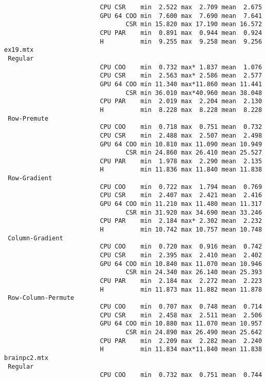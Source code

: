 {\begin{verbatim}
                          CPU CSR    min  2.522 max  2.709 mean  2.675
                          GPU 64 COO min  7.600 max  7.690 mean  7.641
                                 CSR min 15.820 max 17.190 mean 16.572
                          CPU PAR    min  0.891 max  0.944 mean  0.924
                          H          min  9.255 max  9.258 mean  9.256
ex19.mtx
 Regular
                          CPU COO    min  0.732 max* 1.837 mean  1.076
                          CPU CSR    min  2.563 max* 2.586 mean  2.577
                          GPU 64 COO min 11.340 max*11.860 mean 11.441
                                 CSR min 36.010 max*40.960 mean 38.048
                          CPU PAR    min  2.019 max  2.204 mean  2.130
                          H          min  8.228 max  8.228 mean  8.228
 Row-Premute
                          CPU COO    min  0.718 max  0.751 mean  0.732
                          CPU CSR    min  2.488 max  2.507 mean  2.498
                          GPU 64 COO min 10.810 max 11.090 mean 10.949
                                 CSR min 24.860 max 26.410 mean 25.527
                          CPU PAR    min  1.978 max  2.290 mean  2.135
                          H          min 11.836 max 11.840 mean 11.838
 Row-Gradient
                          CPU COO    min  0.722 max  1.794 mean  0.769
                          CPU CSR    min  2.407 max  2.421 mean  2.416
                          GPU 64 COO min 11.210 max 11.480 mean 11.317
                                 CSR min 31.920 max 34.690 mean 33.246
                          CPU PAR    min  2.184 max* 2.302 mean  2.232
                          H          min 10.742 max 10.757 mean 10.748
 Column-Gradient
                          CPU COO    min  0.720 max  0.916 mean  0.742
                          CPU CSR    min  2.395 max  2.410 mean  2.402
                          GPU 64 COO min 10.840 max 11.070 mean 10.946
                                 CSR min 24.340 max 26.140 mean 25.393
                          CPU PAR    min  2.184 max  2.272 mean  2.223
                          H          min 11.873 max 11.882 mean 11.878
 Row-Column-Permute
                          CPU COO    min  0.707 max  0.748 mean  0.714
                          CPU CSR    min  2.458 max  2.511 mean  2.506
                          GPU 64 COO min 10.880 max 11.070 mean 10.957
                                 CSR min 24.890 max 26.490 mean 25.642
                          CPU PAR    min  2.209 max  2.282 mean  2.240
                          H          min 11.834 max*11.840 mean 11.838
brainpc2.mtx
 Regular
                          CPU COO    min  0.732 max  0.751 mean  0.744

\end{verbatim}}
